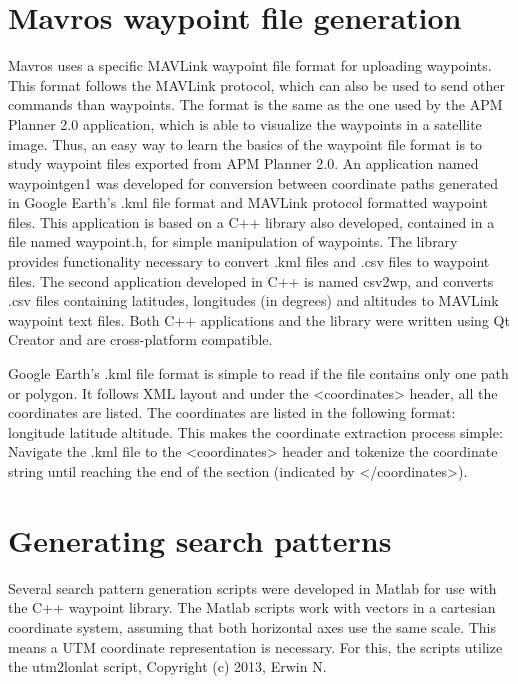 \section{Mavros waypoint file generation}
\label{waypointgen}
Mavros uses a specific MAVLink waypoint file format for uploading waypoints.
This format follows the MAVLink protocol, which can also be used to send other commands than waypoints.
The format is the same as the one used by the APM Planner 2.0 application,
which is able to visualize the waypoints in a satellite image.
Thus, an easy way to learn the basics of the waypoint file format
is to study waypoint files exported from APM Planner 2.0.
An application named waypointgen1 was developed for conversion between coordinate paths generated
in Google Earth's .kml file format
and MAVLink protocol formatted waypoint files.
This application is based on a C++ library also developed, contained in a file named waypoint.h,
for simple manipulation of waypoints.
The library provides functionality necessary to
convert .kml files and .csv files to waypoint files.
The second application developed in C++ is named csv2wp, and converts .csv files containing
latitudes, longitudes (in degrees) and altitudes to MAVLink waypoint text files.
Both C++ applications and the library were written using Qt Creator and are cross-platform compatible.

Google Earth's .kml file format is simple to read if the file contains only one path or polygon.
It follows XML layout and under the \textless{}coordinates\textgreater{} header, all the coordinates are listed.
The coordinates are listed in the following format: longitude latitude altitude.
This makes the coordinate extraction process simple: Navigate the .kml file to the \textless{}coordinates\textgreater{}
header and tokenize the coordinate string until reaching the end of the section (indicated by
\textless{}/coordinates\textgreater{}).

\section{Generating search patterns}
\label{sec:searchpatterns}
Several search pattern generation scripts were developed in Matlab for use with the C++ waypoint
library.
The Matlab scripts work with vectors in a cartesian coordinate system, assuming that both horizontal axes
use the same scale. This means a UTM coordinate representation is necessary. For this, the scripts
utilize the utm2lonlat script, Copyright (c) 2013, Erwin N.

